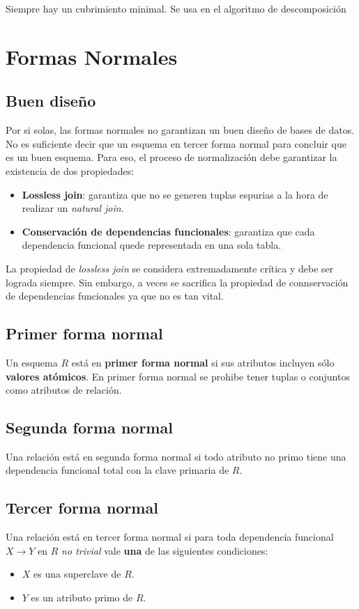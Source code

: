 \documentclass[]{article}
\begin{document}
Siempre hay un cubrimiento minimal. Se usa en el algoritmo de descomposición

\section{Formas Normales}
\subsection{Buen diseño}
Por si solas, las formas normales no garantizan un buen diseño de bases de datos. No es suficiente decir que un esquema en tercer forma normal para concluir que es un buen esquema. Para eso, el proceso de normalización debe garantizar la existencia de dos propiedades:
\begin{itemize}
    \item \textbf{Lossless join}: garantiza que no se generen tuplas espurias a la hora de realizar un \emph{natural join}.
    \item \textbf{Conservación de dependencias funcionales}: garantiza que cada dependencia funcional quede representada en una sola tabla.
\end{itemize}

La propiedad de \emph{lossless join} se considera extremadamente crítica y debe ser lograda siempre. Sin embargo, a veces se sacrifica la propiedad de connservación de dependencias funcionales ya que no es tan vital.

\subsection{Primer forma normal}
Un esquema $R$ está en \textbf{primer forma normal} si sus atributos incluyen sólo \textbf{valores atómicos}. En primer forma normal se prohibe tener tuplas o conjuntos como atributos de relación.

\subsection{Segunda forma normal}
Una relación está en segunda forma normal si todo atributo no primo tiene una dependencia funcional total con la clave primaria de $R$.

\subsection{Tercer forma normal}
Una relación está en tercer forma normal si para toda dependencia funcional $X\rightarrow Y$ en $R$ \emph{no trivial} vale \textbf{una} de las siguientes condiciones:
\begin{itemize}
    \item $X$ es una superclave de $R$.
    \item $Y$ es un atributo primo de $R$.
\end{itemize}
\end{document}
